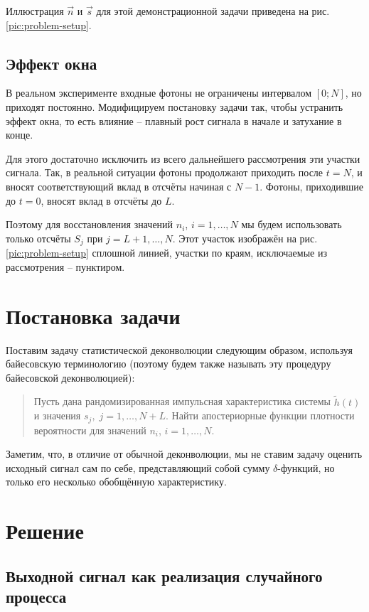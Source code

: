 \documentclass[12pt]{book}
\begin{document}
	Иллюстрация $\vec{n}$ и $\vec{s}$ для этой демонстрационной задачи приведена на рис. \ref{pic:problem-setup}.
	
	\subsection{Эффект окна} \label{sec:edge-effects}
	
	В реальном эксперименте входные фотоны не ограничены интервалом $[0; N]$, но приходят постоянно. Модифицируем постановку задачи так, чтобы устранить эффект окна, то есть влияние  -- плавный рост сигнала в начале и затухание в конце.
	
	Для этого достаточно исключить из всего дальнейшего рассмотрения эти участки сигнала. Так, в реальной ситуации фотоны продолжают приходить после $t=N$, и вносят соответствующий вклад в отсчёты начиная с $N-1$. Фотоны, приходившие до $t=0$, вносят вклад в отсчёты до $L$.
	
	Поэтому для восстановления значений $n_i$, $i = 1, \ldots, N$ мы будем использовать только отсчёты $S_j$ при $j = L+1, \ldots, N$. Этот участок изображён на рис. \ref{pic:problem-setup} сплошной линией, участки по краям, исключаемые из рассмотрения -- пунктиром.
	
	
	\section{Постановка задачи}
	
	Поставим задачу статистической деконволюции следующим образом, используя байесовскую терминологию (поэтому будем также называть эту процедуру байесовской деконволюцией):
	
	\begin{quote}
		Пусть дана рандомизированная импульсная характеристика системы $\tilde{h}(t)$ и значения $s_j, \; j = 1, \ldots, N + L$. Найти апостериорные функции плотности вероятности для значений $n_i$, $i = 1, \ldots, N$.
	\end{quote}
	
	Заметим, что, в отличие от обычной деконволюции, мы не ставим задачу оценить исходный сигнал сам по себе, представляющий собой сумму $\delta$-функций, но только его несколько обобщённую характеристику.

	\section{Решение}

	\subsection{Выходной сигнал как реализация случайного процесса}
	
\end{document}
